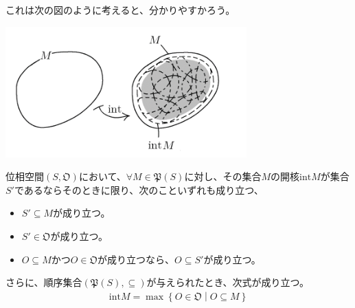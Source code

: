 \documentclass[dvipdfmx]{jsarticle}
\begin{document}
これは次の図のように考えると、分かりやすかろう。
\begin{center}
\includegraphics[width=93mm]{8.1.1.a.png}
\end{center}
\begin{thm}\label{8.1.1.2}
位相空間$\left( S,\mathfrak{O} \right)$において、$\forall M \in \mathfrak{P}(S)$に対し、その集合$M$の開核${\mathrm{int}}M$が集合$S'$であるならそのときに限り、次のこといずれも成り立つ、
\begin{itemize}
\item
  $S' \subseteq M$が成り立つ。
\item
  $S'\in \mathfrak{O}$が成り立つ。
\item
  $O \subseteq M$かつ$O \in \mathfrak{O}$が成り立つなら、$O \subseteq S'$が成り立つ。
\end{itemize}
さらに、順序集合$\left( \mathfrak{P}(S), \subseteq \right)$が与えられたとき、次式が成り立つ。
\begin{align*}
{\mathrm{int}}M = \max\left\{ O \in \mathfrak{O} \middle| O \subseteq M \right\}
\end{align*}
\end{thm}
\end{document}
